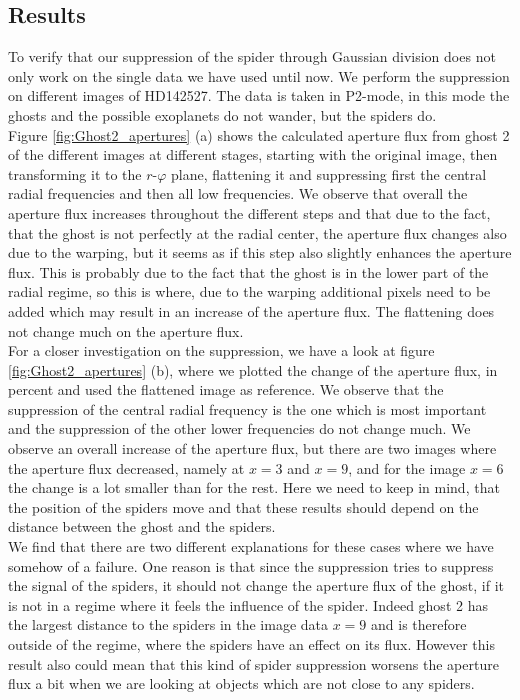 \subsection{Results}
To verify that our suppression of the spider through Gaussian division does not only work on the single data we have used until now. We perform the suppression on different images of HD142527. The data is taken in P2-mode, in this mode the ghosts and the possible exoplanets do not wander, but the spiders do. \\
Figure \ref{fig:Ghost2_apertures} (a) shows the calculated aperture flux from ghost 2 of the different images at different stages, starting with the original image, then transforming it to the $r$-$\varphi$ plane, flattening it and suppressing first the central radial frequencies and then all low frequencies. We observe that overall the aperture flux increases throughout the different steps and that due to the fact, that the ghost is not perfectly at the radial center, the aperture flux changes also due to the warping, but it seems as if this step also slightly enhances the aperture flux. This is probably due to the fact that the ghost is in the lower part of the radial regime, so this is where, due to the warping additional pixels need to be added which may result in an increase of the aperture flux. The flattening does not change much on the aperture flux.\\
For a closer investigation on the suppression, we have a look at figure \ref{fig:Ghost2_apertures} (b), where we plotted the change of the aperture flux, in percent and used the flattened image as reference. We observe that the suppression of the central radial frequency is the one which is most important and the suppression of the other lower frequencies do not change much. We observe an overall increase of the aperture flux, but there are two images where the aperture flux decreased, namely at $x=3$ and $x=9$, and for the image $x=6$ the change is a lot smaller than for the rest. Here we need to keep in mind, that the position of the spiders move and that these results should depend on the distance between the ghost and the spiders. \\
We find that there are two different explanations for these cases where we have somehow of a failure. One reason is that since the suppression tries to suppress the signal of the spiders, it should not change the aperture flux of the ghost, if it is not in a regime where it feels the influence of the spider. Indeed ghost 2 has the largest distance to the spiders in the image data $x=9$ and is therefore outside of the regime, where the spiders have an effect on its flux. However this result also could mean that this kind of spider suppression worsens the aperture flux a bit when we are looking at objects which are not close to any spiders.\\
